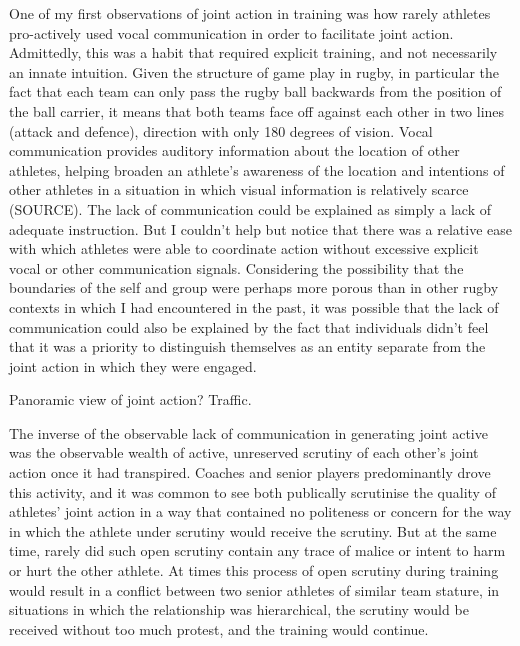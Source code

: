  One of my first observations of joint action in training was how rarely athletes pro-actively used vocal communication in order to facilitate joint action.  Admittedly, this was a habit that required explicit training, and not necessarily an innate intuition.  Given the structure of game play in rugby, in particular the fact that each team can only pass the rugby ball backwards from the position of the ball carrier, it means that both teams face off against each other in two lines (attack and defence), direction with only 180 degrees of vision. Vocal communication provides auditory information about the location of other athletes, helping broaden an athlete's awareness of the location and intentions of other athletes in a situation in which visual information is relatively scarce (SOURCE).  The lack of communication could be explained as simply a lack of adequate instruction.  But I couldn't help but notice that there was a relative ease with which athletes were able to coordinate action without excessive explicit vocal or other communication signals.  Considering the possibility that the boundaries of the self and group were perhaps more porous than in other rugby contexts in which I had encountered in the past, it was possible that the lack of communication could also be explained by the fact that individuals didn't feel that it was a priority to distinguish themselves as an entity separate from the joint action in which they were engaged.

  Panoramic view of joint action? Traffic.



  The inverse of the observable lack of communication in generating joint active was the observable wealth of active, unreserved scrutiny of each other's joint action once it had transpired.  Coaches and senior players predominantly drove this activity, and it was common to see both publically scrutinise the quality of athletes' joint action in a way that contained no politeness or concern for the way in which the athlete under scrutiny would receive the scrutiny. But at the same time, rarely did such open scrutiny contain any trace of malice or intent to harm or hurt the other athlete.  At times this process of open scrutiny during training would result in a conflict between two senior athletes of similar team stature, in situations in which the relationship was hierarchical, the scrutiny would be received without too much protest, and the training would continue.

